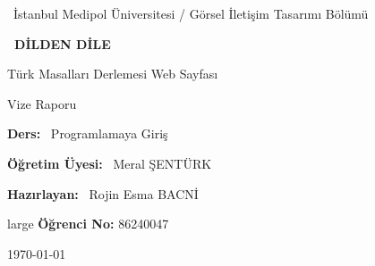 \documentclass[12pt,a4paper]{article}
\begin{document}
\begin{titlepage}
\centering
\vspace*{1cm}
{\large \ İstanbul Medipol Üniversitesi / Görsel İletişim Tasarımı Bölümü }
\vspace{1.8cm}
{\Huge\bfseries\color{ana}  \ DİLDEN DİLE \par}
\vspace{1.8cm}
{\Large Türk Masalları Derlemesi Web Sayfası \par}
{\large Vize Raporu \par}
\vspace{1.8cm}
{\large \textbf{Ders:} \ Programlamaya Giriş \par}
{\large \textbf{Öğretim Üyesi:} \ Meral ŞENTÜRK \par}
\vspace{1.2cm}
{\large \textbf{Hazırlayan:} \ Rojin Esma BACNİ \par}
{large \textbf {Öğrenci No:} 86240047 \par}
\vspace{1.8cm}
\vfill
{\large \today \par}
\end{titlepage}

\tableofcontents
\newpage

\end{document}
